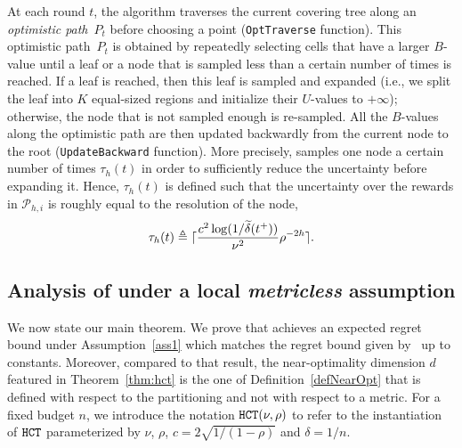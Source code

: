 At each round $t$, the algorithm traverses the current covering tree along an \emph{optimistic path}~$P_t$ before choosing a point (\texttt{OptTraverse} function). This optimistic path~$P_t$ is obtained by repeatedly selecting cells that have a larger $B$-value until a leaf or a node that is sampled less than a certain number of times is reached. If a leaf is reached, then this leaf is sampled and expanded (i.e., we split the leaf into $K$ equal-sized regions and initialize their $U$-values to $+\infty$); otherwise, the node that is not sampled enough is re-sampled. All the $B$-values along the optimistic path are then updated backwardly from the current node to the root (\texttt{UpdateBackward} function). More precisely, \HCT{} samples one node a certain number of times $\tau_h(t)$ in order to sufficiently reduce the uncertainty before expanding it. Hence, $\tau_h(t)$ is defined such that the uncertainty over the rewards in $\mathcal{P}_{h,i}$ is roughly equal to the resolution of the node,
\[
	\tau_h(t) \triangleq \lceil\frac{c^2\operatorname{log}(1/\widetilde{\delta}(t^+))}{\nu^2}\rho^{-2h}\rceil.
\]

\subsection{Analysis of \HCT \textbf{under a local \emph{metricless} assumption}}\label{sec:gpo.analysis}
We now state our main theorem. We prove that \HCT achieves an expected regret bound under Assumption~\ref{ass1} which matches the regret bound given by~\cite{azar2014online} up to constants. Moreover, compared to that result, the near-optimality dimension $d$ featured in Theorem~\ref{thm:hct} is the one of Definition~\ref{defNearOpt} that is defined with respect to the partitioning and not with respect to a metric. For a fixed budget $n$, we introduce the notation $\texttt{HCT}{}(\nu,\rho)$ to refer to the instantiation of $\texttt{HCT}{}$ parameterized by $\nu$, $\rho$, $c=2\sqrt{1/(1-\rho)}$ and $\delta = 1/n$.


